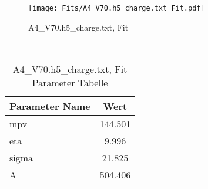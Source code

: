 \begin{figure}[ht] 
 	\centering 
 	\texttt{[image: Fits/A4\_V70.h5\_charge.txt\_Fit.pdf]} 
	\caption{A4_V70.h5_charge.txt, Fit} 
 	\label{fig:A4_V70.h5_charge.txt, Fit} 
\end{figure}
 \\ 
\begin{table}[ht] 
\centering 
\caption{A4_V70.h5_charge.txt, Fit Parameter Tabelle} 
\label{tab:my-table}
\begin{tabular}{|l|c|}
\hline
Parameter Name	&	Wert \\ \hline
mpv	&	 144.501\\ \hline
eta	&	 9.996\\ \hline
sigma	&	 21.825\\ \hline
A	&	 504.406\\ \hline
\end{tabular} 
\end{table}